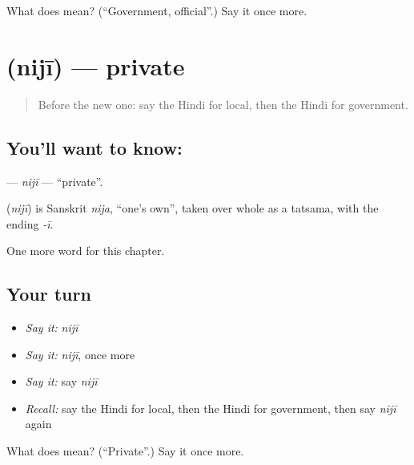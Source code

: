 \begin{tcolorbox}[breakable,colback=teal!4,colframe=teal!35!black,title={Before you move on}]
What does  mean? (\textquotedblleft{}Government, official\textquotedblright{}.) Say it once more.
\end{tcolorbox}
\section[\texorpdfstring{\hi{निजी} (nijī)}{निजी (nijī)}]{ (nijī) — private}

\label{lesson:HI-C241-niji}



\begin{quote}
Before the new one: say the Hindi for local, then the Hindi for government.
\end{quote}

\subsection*{You'll want to know: }
\textbf{} — \emph{nijī} — \textquotedblleft{}private\textquotedblright{}.

\begin{cousinweb}
\textbf{} (\emph{nijī}) is Sanskrit \emph{nija}, \textquotedblleft{}one's own\textquotedblright{}, taken over whole as a tatsama, with the ending \emph{-ī}.
\end{cousinweb}

\begin{grammarlens}[title={What you've built}]
One more word for this chapter.
\end{grammarlens}

\subsection*{Your turn}
\begin{itemize}
\raggedright
  \item \emph{Say it:} \emph{nijī}
  \item \emph{Say it:} \emph{nijī}, once more
  \item \emph{Say it:} say \emph{nijī}
  \item \emph{Recall:} say the Hindi for local, then the Hindi for government, then say \emph{nijī} again
\end{itemize}

\begin{tcolorbox}[breakable,colback=teal!4,colframe=teal!35!black,title={Before you move on}]
What does  mean? (\textquotedblleft{}Private\textquotedblright{}.) Say it once more.
\end{tcolorbox}
